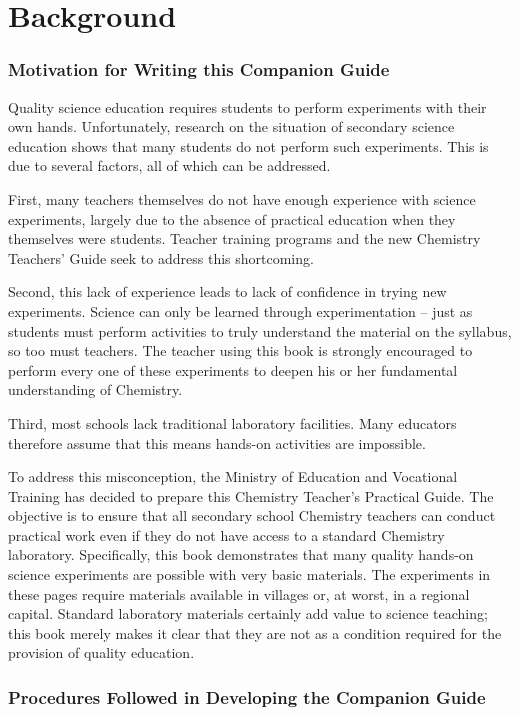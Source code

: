 \chapter*{Background}

\subsection*{Motivation for Writing this Companion Guide}

Quality science education requires students to perform experiments with their own hands. Unfortunately, research on the situation of secondary science education shows that many students do not perform such experiments. This is due to several factors, all of which can be addressed.

First, many teachers themselves do not have enough experience with science experiments, largely due to the absence of practical education when they themselves were students. Teacher training programs and the new Chemistry Teachers' Guide seek to address this shortcoming.

Second, this lack of experience leads to lack of confidence in trying new experiments. Science can only be learned through experimentation -- just as students must perform activities to truly understand the material on the syllabus, so too must teachers. The teacher using this book is strongly encouraged to perform every one of these experiments to deepen his or her fundamental understanding of Chemistry.

Third, most schools lack traditional laboratory facilities. Many educators therefore assume that this means hands-on activities are impossible.

To address this misconception, the Ministry of Education and Vocational Training has decided to prepare this Chemistry Teacher's Practical Guide. The objective is to ensure that all secondary school Chemistry teachers can conduct practical work even if they do not have access to a standard Chemistry laboratory. Specifically, this book demonstrates that many quality hands-on science experiments are possible with very basic materials. The experiments in these pages require materials available in villages or, at worst, in a regional capital. Standard laboratory materials certainly add value to science teaching; this book merely makes it clear that they are not as a condition required for the provision of quality education.

\subsection*{Procedures Followed in Developing the Companion Guide}

